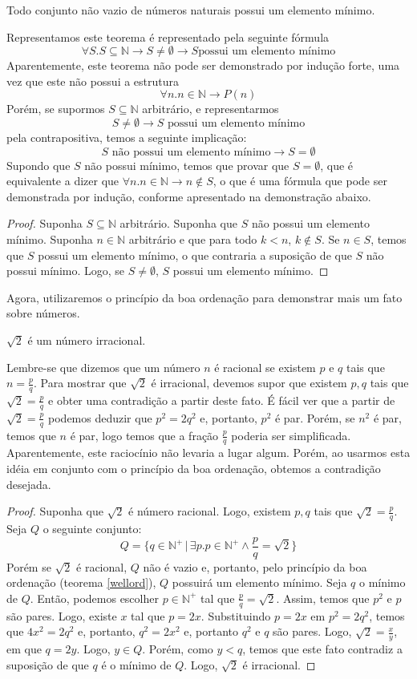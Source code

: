 \begin{Theorem}\label{wellord}
Todo conjunto não vazio de números naturais possui um elemento mínimo.
\end{Theorem}
Representamos este teorema é representado pela seguinte fórmula
\[
\forall S. S\subseteq \mathbb{N} \to S \neq \emptyset \to S\text{
  possui um elemento mínimo}
\]
Aparentemente, este teorema não pode ser demonstrado por indução
forte, uma vez que este não possui a estrutura
\[
\forall n. n\in\mathbb{N} \to P(n)
\]
Porém, se supormos $S\subseteq \mathbb{N}$ arbitrário, e
representarmos
\[S \neq \emptyset \to S\text{ possui um elemento mínimo}\]
pela contrapositiva, temos a seguinte implicação:
\[S\text{ não possui um elemento mínimo} \to S = \emptyset\]
Supondo que $S$ não possui mínimo, temos que provar que $S =
\emptyset$, que é equivalente a dizer que $\forall n. n\in\mathbb{N}
\to n \not\in S$, o que é uma fórmula que pode ser demonstrada por
indução, conforme apresentado na demonstração abaixo.
\begin{proof}
Suponha $S\subseteq\mathbb{N}$ arbitrário. Suponha que $S$ não possui
um elemento mínimo. Suponha $n\in\mathbb{N}$ arbitrário e que para
todo $k < n$, $k \not\in S$. Se $n \in S$, temos que $S$ possui um
elemento mínimo, o que contraria a suposição de que $S$ não possui
mínimo. Logo, se $S \neq \emptyset$, $S$ possui um elemento mínimo.
\end{proof}
Agora, utilizaremos o princípio da boa ordenação para demonstrar mais
um fato sobre números.
\begin{Theorem}
$\sqrt{2}$ é um número irracional.
\end{Theorem}
Lembre-se que dizemos que um número $n$ é racional se existem $p$ e
$q$ tais que $n = \frac{p}{q}$. Para mostrar que $\sqrt{2}$ é
irracional, devemos supor que existem $p,q$ tais que $\sqrt{2} =
\frac{p}{q}$ e obter uma contradição a partir deste fato. É fácil ver
que a partir de $\sqrt{2} =\frac{p}{q}$ podemos deduzir que $p^2 =
2q^2$ e, portanto, $p^2$ é par. Porém, se $n^2$ é par, temos que $n$ é
par, logo temos que a fração $\frac{p}{q}$ poderia ser
simplificada. Aparentemente, este raciocínio não levaria a lugar
algum. Porém, ao usarmos esta idéia em conjunto com o princípio da boa
ordenação, obtemos a contradição desejada.
\begin{proof}
Suponha que $\sqrt{2}$ é número racional. Logo, existem $p,q$ tais que
$\sqrt{2}=\frac{p}{q}$.
Seja $Q$ o seguinte conjunto:
\[
Q =\{q\in\mathbb{N}^+\,|\,\exists p. p \in \mathbb{N}^+ \land
\frac{p}{q} = \sqrt{2}\}
\]
Porém se $\sqrt{2}$ é racional, $Q$ não é vazio e, portanto, pelo
princípio da boa ordenação (teorema \ref{wellord}), $Q$ possuirá um
elemento mínimo. Seja $q$ o mínimo de $Q$. Então, podemos escolher $p
\in\mathbb{N}^+$ tal que $\frac{p}{q} = \sqrt{2}$. Assim, temos que
$p^2$ e $p$ são pares. Logo, existe $x$ tal que $p = 2x$. Substituindo
$p = 2x$ em $p^2 = 2q^2$, temos que $4x^2 = 2q^2$ e, portanto, $q^2 =
2x^2$ e, portanto $q^2$ e $q$ são pares. Logo, $\sqrt{2} =
\frac{x}{y}$, em que $q = 2y$. Logo, $y\in Q$. Porém, como $y < q$,
temos que este fato contradiz a suposição de que $q$ é o mínimo de $Q$.
Logo, $\sqrt{2}$ é irracional.
\end{proof}

